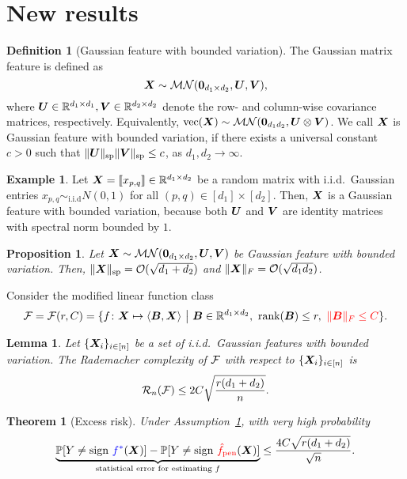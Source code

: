 \documentclass[11pt]{article}
\theoremstyle{plain}
\newtheorem{thm}{Theorem}[section]
\newtheorem{lem}{Lemma}
\newtheorem{prop}{Proposition}
\theoremstyle{definition}
\newtheorem{defn}{Definition}
\newtheorem{exmp}{Example}
\newcommand*{\KeepStyleUnderBrace}[1]{%
  \mathop{%
    \mathchoice
    {\underbrace{\displaystyle#1}}%
    {\underbrace{\textstyle#1}}%
    {\underbrace{\scriptstyle#1}}%
    {\underbrace{\scriptscriptstyle#1}}%
  }\limits
}
\begin{document}
\section{New results}\label{sec:new}
\begin{defn}[Gaussian feature with bounded variation]\label{ass:2}The Gaussian matrix feature is defined as
\[
\bm X\sim \mathcal{M}\mathcal{N}(\mathbf{0}_{d_1\times d_2}, \bm{U}, \bm{V}),
\]
where $\bm{U}\in\mathbb{R}^{d_1\times d_1}, \bm{V}\in\mathbb{R}^{d_2\times d_2}$ denote the row- and column-wise covariance matrices, respectively. Equivalently, $\text{vec}(\bm X)\sim \mathcal{M}\mathcal{N}(\mathbf{0}_{d_1d_2}, \bm{U}\otimes \bm{V})$. We call $\bm X$ is Gaussian feature with bounded variation, if there exists a universal constant $c>0$ such that $\lVert\bm{U}\rVert_\text{sp}\lVert\bm{V}\rVert_\text{sp}\leq c$, as $d_1, d_2\to \infty$.\\
\end{defn}


\begin{exmp} Let $\bm X=\llbracket x_{p,q} \rrbracket\in\mathbb{R}^{d_1\times d_2}$ be a random matrix with i.i.d.\ Gaussian entries $x_{p,q}\sim_{\text{i.i.d}} N(0,1)$ for all $(p,q)\in[d_1]\times [d_2]$. Then, $\bm X$ is a Gaussian feature with bounded variation, because both $\bm{U}$ and $\bm{V}$ are identity matrices with spectral norm bounded by $1$. \\
\end{exmp}

\begin{prop} Let $\bm X\sim\mathcal{M}\mathcal{N}(\mathbf{0}_{d_1\times d_2}, \bm{U}, \bm{V})$ be Gaussian feature with bounded variation. Then, $\lVert\bm X\rVert_\text{sp}=\mathcal{O}(\sqrt{d_1+d_2})$ and $\lVert\bm X\rVert_F=\mathcal{O}(\sqrt{d_1d_2})$.\\
\end{prop}

Consider the modified linear function class
\[
\mathcal{F}=\mathcal{F}(r,C)=\{f\colon \bm X\mapsto \langle \bm B, \bm X\rangle\ \big| \ \bm B\in\mathbb{R}^{d_1\times d_2},\ \text{rank}(\bm B)\leq r, \ {\color{red}\lVert\bm B\rVert_F\leq C}\}.
\]

\begin{lem}\label{lem:norm} Let $\{\bm X_i\}_{i\in[n]}$ be a set of i.i.d.\ Gaussian features with bounded variation. The Rademacher complexity of $\mathcal{F}$ with respect to $\{\bm X_i\}_{i\in[n]}$ is
\[
\mathcal{R}_n(\mathcal{F})\leq 2C\sqrt{r (d_1+d_2)\over n}.
\]
\end{lem}


\begin{thm}[Excess risk]\label{thm:main}Under Assumption~\ref{ass:2}, with very high probability
\begin{equation}\label{cor}
\KeepStyleUnderBrace{\mathbb{P}[Y\neq \text{sign }{\color{blue}f^*}(\mX)] - \mathbb{P}[Y\neq \text{sign } {\color{red}\hat f_{\text{pen}}}(\mX)]}_{\text{statistical error for estimating $f$}}\leq {4C\sqrt{r(d_1+d_2)}\over \sqrt{n}}.
\end{equation}
\end{thm}
\end{document}
